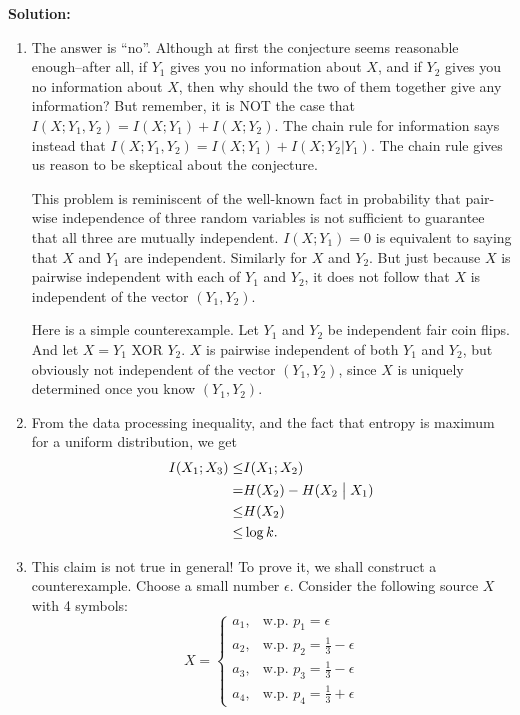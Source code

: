 \documentclass[12pt]{article}
\begin{document}
\begin{enumerate}
\begin{enumerate}[1)]
\end{enumerate}

\vskip 0.2in
\begin{solution}
{\bf Solution:}\\

\begin{enumerate}[1)]
\item The answer is ``no''.  Although at first the conjecture seems reasonable enough--after all, if $Y_1$ gives you no information about $X$, and if $Y_2$ gives you no information about $X$, then why should
the two of them together give any information?  But remember, it is NOT the case that $I(X;Y_1,Y_2) = I(X;Y_1) + I(X;Y_2)$.  The chain rule for information says instead that $I(X;Y_1, Y_2) = I(X;Y_1) + I(X;Y_2|Y_1)$.  The chain rule gives us reason to be skeptical about the conjecture.

This problem is reminiscent of the well-known fact in probability that pair-wise independence of three random variables is not sufficient to guarantee that all three are mutually independent.  $I(X;Y_1) = 0$ is equivalent to saying that $X$ and $Y_1$ are independent.  Similarly for $X$ and $Y_2$.  But just because $X$ is pairwise independent with each of $Y_1$ and $Y_2$, it does not follow that $X$ is independent of the vector $(Y_1,Y_2)$.

Here is a simple counterexample.  Let $Y_1$ and $Y_2$ be independent fair coin flips.  And let $X = Y_1$ XOR $Y_2$. $X$ is pairwise independent of both $Y_1$ and $Y_2$, but obviously not independent of the vector $(Y_1, Y_2)$, since $X$ is uniquely determined once you know $(Y_1, Y_2)$.

\item 
From the data processing inequality, and the fact that entropy is maximum for a uniform distribution, we get 
\begin{align*}
I(X_1;X_3)\leq& I(X_1;X_2) \\
=&  H(X_2)-H(X_2\bigm | X_1) \\
\leq&  H(X_2)           \\
\leq&  \log k. 
\end{align*}

\item This claim is not true in general! To prove it, we shall construct a counterexample.
Choose a small number $\epsilon$. Consider the following source $X$ with 4 symbols:
$$X =
\begin{cases} 
a_1, & \text{w.p. } p_1 = \epsilon \\ 
a_2, & \text{w.p. } p_2 = \frac{1}{3} - \epsilon \\ 
a_3, & \text{w.p. } p_3 = \frac{1}{3} - \epsilon \\ 
a_4, & \text{w.p. } p_4 = \frac{1}{3} + \epsilon 
\end{cases}$$


\end{enumerate}
\end{solution}
\end{enumerate}
\end{document}

